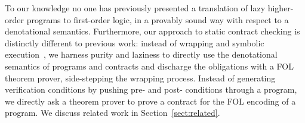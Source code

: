 To our knowledge no one has previously presented a translation of lazy higher-order programs to
first-order logic, in a provably sound way with respect to a denotational
semantics. Furthermore, our approach to static contract checking is
distinctly different to previous work: instead of wrapping and
symbolic execution~\cite{xu+:contracts,Xu:2012:HCC:2103746.2103767},
we harness purity and laziness to directly use the denotational semantics
of programs and contracts and discharge the obligations with a
FOL theorem prover, side-stepping
the wrapping process. Instead of generating verification conditions by pushing
pre- and post- conditions through a program, we directly ask a theorem prover to prove
a contract for the FOL encoding of a program.
We discuss related work in Section~\ref{sect:related}.









